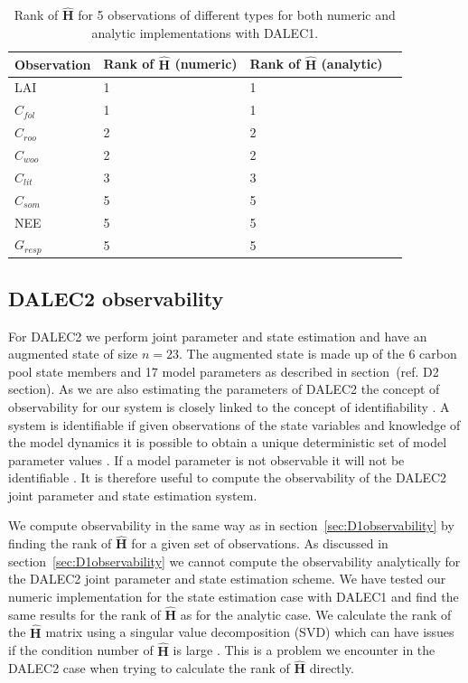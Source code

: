 \documentclass[11pt]{article}
\begin{document}
\begin{table}[ht] 
\begin{center}
	\begin{tabular}{| l | l | l | l}
	\hline
	Observation & Rank of $\hat{\textbf{H}}$ (numeric) & Rank of $\hat{\textbf{H}}$ (analytic) \\ \hline
	LAI & 1 & 1 \\ \hline
	$C_{fol}$ & 1 & 1  \\ \hline
	$C_{roo}$ & 2 & 2 \\ \hline
	$C_{woo}$ & 2 & 2 \\ \hline
	$C_{lit}$ & 3 & 3 \\ \hline
	$C_{som}$ & 5 & 5 \\ \hline
	NEE & 5 & 5 \\ \hline
	$G_{resp}$ & 5 & 5 \\  
	\hline
	\end{tabular}
	\caption{Rank of $\hat{\textbf{H}}$ for 5 observations of different types for both numeric and analytic implementations with DALEC1.}
	\label{table: a_n_h_D1}
\end{center} 
\end{table}

\FloatBarrier
\subsection{DALEC2 observability} \label{sec: D2_observability}

For DALEC2 we perform joint parameter and state estimation and have an augmented state of size $n = 23$. The augmented state is made up of the 6 carbon pool state members and 17 model parameters as described in section~({\color{red}ref. D2 section}). As we are also estimating the parameters of DALEC2 the concept of observability for our system is closely linked to the concept of identifiability \citep{navon1998practical}. A system is identifiable if given observations of the state variables and knowledge of the model dynamics it is possible to obtain a unique deterministic set of model parameter values \citep{ljung1998system}. If a model parameter is not observable it will not be identifiable \citep{Jacquez1985}. It is therefore useful to compute the observability of the DALEC2 joint parameter and state estimation system.

We compute observability in the same way as in section~\ref{sec:D1observability} by finding the rank of $\hat{\textbf{H}}$ for a given set of observations. As discussed in section~\ref{sec:D1observability} we cannot compute the observability analytically for the DALEC2 joint parameter and state estimation scheme. We have tested our numeric implementation for the state estimation case with DALEC1 and find the same results for the rank of $\hat{\textbf{H}}$ as for the analytic case. We calculate the rank of the $\hat{\textbf{H}}$ matrix using a singular value decomposition (SVD) which can have issues if the condition number of $\hat{\textbf{H}}$ is large \citep{Paige1981}. This is a problem we encounter in the DALEC2 case when trying to calculate the rank of $\hat{\textbf{H}}$ directly.  
\end{document}
